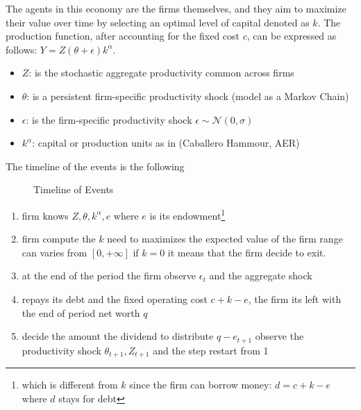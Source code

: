 \documentclass{article}
\begin{document}
\par
The agents in this economy are the firms themselves, and they aim to maximize their value over time by selecting an
optimal level of capital denoted as $k$. The production function, after accounting for the fixed cost $c$, can be
expressed as follows: $Y = Z(\theta + \epsilon)k^\alpha$.
\begin{itemize}
    \item $Z$: is the stochastic aggregate productivity common across firms 
    \item $\theta$: is a persistent firm-specific productivity shock (model as a Markov Chain)     
    \item $\epsilon$: is the firm-specific productivity shock $\epsilon\sim\mathcal{N}(0,\sigma ) $
    \item $k^\alpha$: capital or production units as in (Caballero Hammour, AER)
\end{itemize}
The timeline of the events is the following
\begin{figure}[h]
    \centering
    \caption{Timeline of Events}
\end{figure}
\begin{enumerate}
    \item firm knows \(Z,\theta,k^\alpha,e\) where $e$ is its endowment\footnote{which is different from $k$ since the
    firm can borrow money: \(d=c+k-e\) where $d$ stays for debt} 
    \item firm compute the $k$ need to maximizes the expected value of the firm range can varies from \([0,+\infty]\) if
    $k=0$ it means that the firm decide to exit.
    \item at the end of the period the firm observe \(\epsilon_{t}\) and the aggregate shock
    \item repays its debt and the fixed operating cost \(c+k-e\), the firm its left with the end of period net worth $q$
    \item decide the amount the dividend to distribute \(q-e_{t+1}\) observe the productivity shock \(\theta_{t+1},
    Z_{t+1}\) and the step restart from 1
\end{enumerate}
\end{document}
